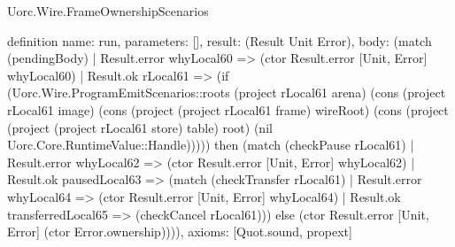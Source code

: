 \begin{lexlean}{Uorc.Wire.FrameOwnershipScenarios}
\begin{semanticmodule}
definition{
  name: run,
  parameters: [],
  result: (Result Unit Error),
  body: (match (pendingBody)
    | Result.error whyLocal60 => (ctor Result.error [Unit, Error] whyLocal60)
    | Result.ok rLocal61 => (if (Uorc.Wire.ProgramEmitScenarios::roots (project rLocal61 arena) (cons (project rLocal61 image) (cons (project (project rLocal61 frame) wireRoot) (cons (project (project (project rLocal61 store) table) root) (nil Uorc.Core.RuntimeValue::Handle))))) then (match (checkPause rLocal61)
      | Result.error whyLocal62 => (ctor Result.error [Unit, Error] whyLocal62)
      | Result.ok pausedLocal63 => (match (checkTransfer rLocal61)
        | Result.error whyLocal64 => (ctor Result.error [Unit, Error] whyLocal64)
        | Result.ok transferredLocal65 => (checkCancel rLocal61))) else (ctor Result.error [Unit, Error] (ctor Error.ownership)))),
  axioms: [Quot.sound, propext]
}
\end{semanticmodule}
\end{lexlean}
